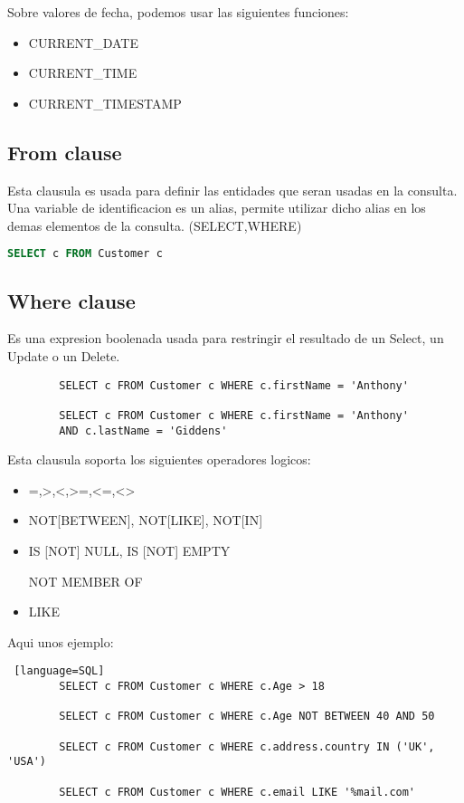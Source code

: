 \documentclass{article}
\begin{document}
Sobre valores de fecha, podemos usar las siguientes funciones:

\begin{itemize}
	\item CURRENT\_DATE
	\item CURRENT\_TIME
	\item CURRENT\_TIMESTAMP
\end{itemize}

\subsection*{From clause}

Esta clausula es usada para definir las entidades que seran usadas en la consulta. Una variable de identificacion es un alias, permite utilizar dicho alias en los demas elementos de la consulta.
(SELECT,WHERE)

\begin{lstlisting}[language=SQL]
        SELECT c FROM Customer c
    \end{lstlisting}
\subsection*{Where clause}
Es una expresion boolenada usada para restringir el resultado de un Select, un Update o un Delete.

\begin{lstlisting}
        SELECT c FROM Customer c WHERE c.firstName = 'Anthony'

        SELECT c FROM Customer c WHERE c.firstName = 'Anthony' 
        AND c.lastName = 'Giddens'
    \end{lstlisting}

Esta clausula soporta los siguientes operadores logicos:
\begin{itemize}
	\item =,>,<,>=,<=,<>
	\item NOT[BETWEEN], NOT[LIKE], NOT[IN]
	\item IS [NOT] NULL, IS [NOT] EMPTY
	\item [NOT] MEMBER OF
	\item LIKE
\end{itemize}

Aqui unos ejemplo:

\begin{lstlisting} [language=SQL]
        SELECT c FROM Customer c WHERE c.Age > 18

        SELECT c FROM Customer c WHERE c.Age NOT BETWEEN 40 AND 50

        SELECT c FROM Customer c WHERE c.address.country IN ('UK', 'USA')

        SELECT c FROM Customer c WHERE c.email LIKE '%mail.com'
    \end{lstlisting}
\end{document}
